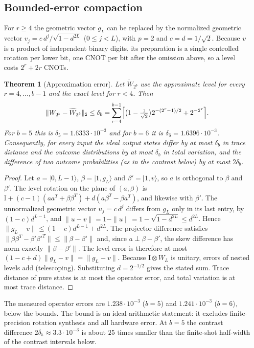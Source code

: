 \documentclass[11pt]{article}
\newtheorem{theorem}{Theorem}
\newcommand{\ket}[1]{\lvert #1\rangle}
\newcommand{\id}{\mathrm{I}}
\begin{document}
\subsection{Bounded-error compaction}
For $r\ge4$ the geometric vector $g_L$ can be replaced by the normalized geometric vector $v_j=c\,d^j/\sqrt{1-d^{2L}}$ ($0\le j<L$), with $p=2$ and $c=d=1/\sqrt2$. Because $v$ is a product of independent binary digits, its preparation is a single controlled rotation per lower bit, one CNOT per bit after the omission above, so a level costs $2^r+2r$ CNOTs.
\begin{theorem}[Approximation error]\label{thm:approx}
Let $\widetilde W_{2^b}$ use the approximate level for every $r=4,\dots,b-1$ and the exact level for $r<4$. Then
\begin{equation}
 \|W_{2^b}-\widetilde W_{2^b}\|_2\le\delta_b=\sum_{r=4}^{b-1}\Bigl[\bigl(1-\tfrac1{\sqrt2}\bigr)2^{-(2^r-1)/2}+2^{-2^r}\Bigr].
\end{equation}
For $b=5$ this is $\delta_5=1.6333\cdot10^{-3}$ and for $b=6$ it is $\delta_6=1.6396\cdot10^{-3}$. Consequently, for every input the ideal output states differ by at most $\delta_b$ in trace distance and the outcome distributions by at most $\delta_b$ in total variation, and the difference of two outcome probabilities (as in the contrast below) by at most $2\delta_b$.
\end{theorem}
\begin{proof}
Let $a=\ket{0,L-1}$, $\beta=\ket{1,g_L}$ and $\beta'=\ket{1,v}$, so $a$ is orthogonal to $\beta$ and $\beta'$. The level rotation on the plane of $(a,\beta)$ is $\id+(c-1)(aa^T+\beta\beta^T)+d(a\beta^T-\beta a^T)$, and likewise with $\beta'$. The unnormalized geometric vector $u_j=c\,d^j$ differs from $g_L$ only in its last entry, by $(1-c)d^{L-1}$, and $\|u-v\|=1-\|u\|=1-\sqrt{1-d^{2L}}\le d^{2L}$. Hence $\|g_L-v\|\le(1-c)d^{L-1}+d^{2L}$. The projector difference satisfies $\|\beta\beta^T-\beta'\beta'^T\|\le\|\beta-\beta'\|$ and, since $a\perp\beta-\beta'$, the skew difference has norm exactly $\|\beta-\beta'\|$. The level error is therefore at most $(1-c+d)\|g_L-v\|=\|g_L-v\|$. Because $\id\otimes W_L$ is unitary, errors of nested levels add (telescoping). Substituting $d=2^{-1/2}$ gives the stated sum. Trace distance of pure states is at most the operator error, and total variation is at most trace distance.
\end{proof}
The measured operator errors are $1.238\cdot10^{-3}$ ($b=5$) and $1.241\cdot10^{-3}$ ($b=6$), below the bounds. The bound is an ideal-arithmetic statement: it excludes finite-precision rotation synthesis and all hardware error. At $b=5$ the contrast difference $2\delta_5\approx3.3\cdot10^{-3}$ is about $25$ times smaller than the finite-shot half-width of the contrast intervals below.
\end{document}

